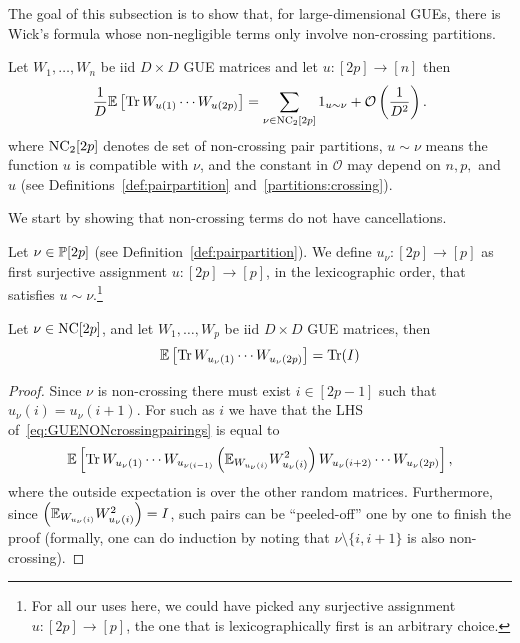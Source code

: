The goal of this subsection is to show that, for large-dimensional GUEs, there is Wick's formula whose non-negligible terms only involve non-crossing partitions.

\begin{lemma}\label{lemma:WicksformulaGUE}
Let $W_1,\dots,W_n$ be iid $D\times D$ GUE matrices and let $u:[2p]\to[n]$ then
\[
\frac1D\mathbb{E}\left[\operatorname{Tr} W_{u(1)}\cdots W_{u(2p)}\right] = \sum_{\nu\in \mathrm{NC}_2[2p]} 1_{u \sim \nu} + \mathcal{O}\left(\frac1{D^2}\right).
\]
where $\mathrm{NC}_2[2p]$ denotes de set of non-crossing pair partitions, $u \sim \nu$ means the function $u$ is compatible with $\nu$, and the constant in $\mathcal{O}$ may depend on $n,p,$ and $u$ (see Definitions~\ref{def:pairpartition} and~\ref{partitions:crossing}).
\end{lemma}

We start by showing that non-crossing terms do not have cancellations.

\begin{definition}
 Let $\nu\in\mathbb{P}[2p]$ (see Definition~\ref{def:pairpartition}). We define $u_{\nu}:[2p]\to[p]$ as first surjective assignment $u:[2p]\to[p]$, in the lexicographic order, that satisfies $u\sim \nu$.\footnote{For all our uses here, we could have picked any surjective assignment $u:[2p]\to[p]$, the one that is lexicographically first is an arbitrary choice.}
\end{definition}

\begin{proposition}\label{prop:GUENONcrossingpairings}
Let $\nu\in\mathrm{NC}[2p]$, and let $W_1,\dots,W_{p}$ be iid $D\times D$ GUE matrices, then
\begin{equation}\label{eq:GUENONcrossingpairings}
    \mathbb{E}\left[\operatorname{Tr} W_{u_\nu(1)}\cdots W_{u_\nu(2p)}\right] = \operatorname{Tr}(I)
\end{equation}
\end{proposition}
\begin{proof}
Since $\nu$ is non-crossing there must exist $i\in[2p-1]$ such that $u_\nu(i)=u_\nu(i+1)$. For such as $i$ we have that the LHS of~\eqref{eq:GUENONcrossingpairings} is equal to
\[
\mathbb{E}\left[\operatorname{Tr} W_{u_\nu(1)}\cdots W_{u_{\nu(i-1)}} \left(\mathbb{E}_{W_{u_\nu(i)}}  W_{u_\nu(i)}^2 \right) W_{u_\nu(i+2)}\cdots W_{u_\nu(2p)}\right],
\]
where the outside expectation is over the other random matrices. Furthermore, since $\left(\mathbb{E}_{W_{u_\nu(i)}}  W_{u_\nu(i)}^2 \right)=I$, such pairs can be ``peeled-off'' one by one to finish the proof (formally, one can do induction by noting that $\nu\setminus\{i,i+1\}$ is also non-crossing).
\end{proof}

